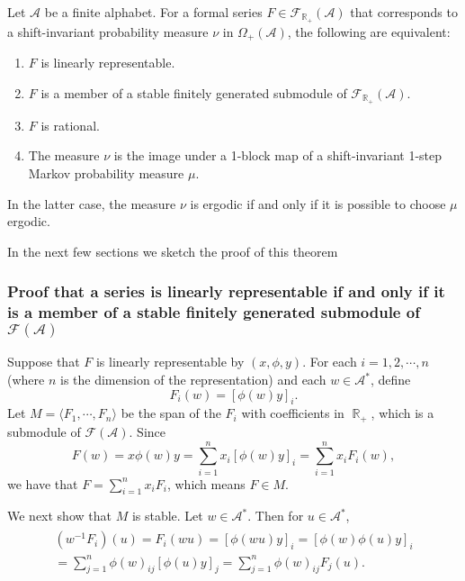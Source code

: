 \documentclass{kepart2010}
\theoremstyle{plain}
\theoremstyle{definition}
\theoremstyle{remark}
\theoremstyle{definition}
\numberwithin{equation}{section}
\begin{document}
\begin{thm}\label{th_rationalequiv}
Let ${{\mathcal A}}$ be a finite alphabet. For a formal series $F \in \mathcal
F_{\operatorname{\mathbb R}_{+}} ({{\mathcal A}})$ that corresponds to a shift-invariant
probability measure $\nu$ in ${\Omega}_{+} ({{\mathcal A}})$, the following are
equivalent:
\begin{enumerate}
\item $F$ is linearly representable.
\item $F$ is a member of a stable finitely generated submodule of $\mathcal F_{\operatorname{\mathbb R}_{+}}
({{\mathcal A}})$.
\item $F$ is rational.
\item The measure $\nu$ is the image under a 1-block map of a shift-invariant
1-step Markov probability measure $\mu$.
\end{enumerate}
In the {latter} case, the measure $\nu$ is ergodic if and only if it
is possible to choose $\mu$ ergodic.
\end{thm}
In the next few sections we sketch the proof of this theorem

\subsubsection{Proof that a series is linearly representable if and only if
it is a member of a stable finitely generated submodule of
${\mathcal F ({{\mathcal A}})}$}\label{subsec_lr=fg}

Suppose that $F$ is linearly representable by $(x, \phi, y)$. For
each $i=1,2, \cdots ,n$ (where $n$ is the dimension of the
representation) and each $ w\in {{\mathcal A}}^{*}$, define
$$F_{i}(w)=[\phi(w)y]_{i}.$$
 Let $M= \langle F_{1},\cdots, F_{n} \rangle$ be the span of the
$F_{i}$ with coefficients in $\operatorname{\mathbb R}_{+}$, which is a submodule of
$\mathcal{F}({{\mathcal A}})$.  Since
$$F(w)=x\phi(w)y=\sum_{i=1}^{n}
x_{i}[\phi(w)y]_{i}= \sum_{i=1}^{n}x_{i}F_{i}(w),$$ we have that $F=
\sum_{i=1}^{n} x_{i}F_{i}$, which means $F\in M$.

We next show that $M$ is stable. Let $w\in {{\mathcal A}}^{*}$.  Then for $u\in
{{\mathcal A}}^{*}$,
\begin{eqnarray*}\begin{gathered}(w^{-1}F_{i})(u)=F_{i}(wu)=[\phi(wu)y]_{i}
=[\phi(w)\phi(u)y]_{i}
\\=\sum_{j=1}^{n} \phi(w)_{ij}[\phi(u)y]_{j}=\sum_{j=1}^{n}
\phi(w)_{ij}F_{j}(u).\end{gathered}\end{eqnarray*}
\end{document}

